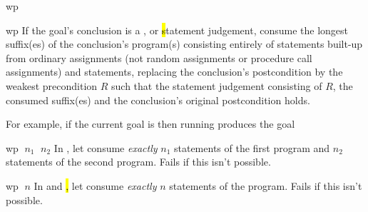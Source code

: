 \begin{tactic}{wp}
  \begin{tsyntax}{wp}
    If the goal's conclusion is a \prhl, \phl or \hl statement
    judgement, consume the longest suffix(es) of the conclusion's
    program(s) consisting entirely of statements built-up from
    ordinary assignments (not random assignments or procedure call
    assignments) and  statements, replacing the conclusion's
    postcondition by the weakest precondition $R$ such that the
    statement judgement consisting of $R$, the consumed suffix(es)
    and the conclusion's original postcondition holds.

    \bigskip For example, if the current goal is
     then
    running 
    produces the goal
  \end{tsyntax}

  \begin{tsyntax}{wp $\;n_1$ $\;n_2$}
    In \prhl, let  consume \emph{exactly} $n_1$ statements of
    the first program and $n_2$ statements of the second
    program. Fails if this isn't possible.
  \end{tsyntax}

  \begin{tsyntax}{wp $\;n$}
    In \phl and \hl, let  consume \emph{exactly} $n$ statements
    of the program. Fails if this isn't possible.
  \end{tsyntax}
\end{tactic}
